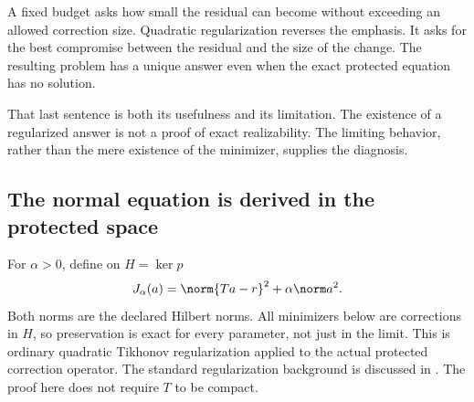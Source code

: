 \clearpage
{}\label{sec:regularized-repair}
A fixed budget asks how small the residual can become without exceeding an allowed correction size. Quadratic regularization reverses the emphasis. It asks for the best compromise between the residual and the size of the change. The resulting problem has a unique answer even when the exact protected equation has no solution.

That last sentence is both its usefulness and its limitation. The existence of a regularized answer is not a proof of exact realizability. The limiting behavior, rather than the mere existence of the minimizer, supplies the diagnosis.

\subsection{The normal equation is derived in the protected space}
For $\alpha>0$, define on $H=\ker p$
\[
 J_\alpha(a)=\norm{Ta-r}^2+\alpha\norm a^2.
\]
Both norms are the declared Hilbert norms. All minimizers below are corrections in $H$, so preservation is exact for every parameter, not just in the limit. This is ordinary quadratic Tikhonov regularization applied to the actual protected correction operator. The standard regularization background is discussed in \cite{clason-inverse}. The proof here does not require $T$ to be compact.

